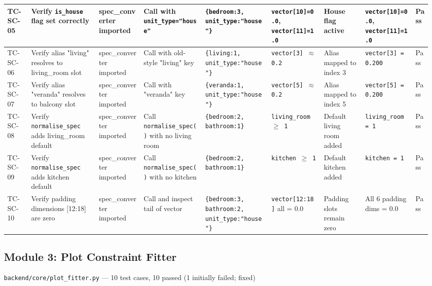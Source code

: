 \begin{landscape}
\begin{longtable}{|p{1.4cm}|p{3.2cm}|p{2.8cm}|p{2.8cm}|p{2.8cm}|p{2.8cm}|p{2.6cm}|p{2.8cm}|p{1.0cm}|}
\rowcolor{passgreen}
TC-SC-05 & Verify \texttt{is\_house} flag set correctly & spec\_converter imported & Call with \texttt{unit\_type="house"} & \texttt{\{bedroom:3, unit\_type:"house"\}} & \texttt{vector[10]=0.0}, \texttt{vector[11]=1.0} & House flag active & \texttt{vector[10]=0.0}, \texttt{vector[11]=1.0} & Pass \\ \hline

\rowcolor{passgreen}
TC-SC-06 & Verify alias "living" resolves to living\_room slot & spec\_converter imported & Call with old-style "living" key & \texttt{\{living:1, unit\_type:"house"\}} & \texttt{vector[3] $\approx$ 0.2} & Alias mapped to index 3 & \texttt{vector[3] = 0.200} & Pass \\ \hline

\rowcolor{passgreen}
TC-SC-07 & Verify alias "veranda" resolves to balcony slot & spec\_converter imported & Call with "veranda" key & \texttt{\{veranda:1, unit\_type:"house"\}} & \texttt{vector[5] $\approx$ 0.2} & Alias mapped to index 5 & \texttt{vector[5] = 0.200} & Pass \\ \hline

\rowcolor{passgreen}
TC-SC-08 & Verify \texttt{normalise\_spec} adds living\_room default & spec\_converter imported & Call \texttt{normalise\_spec()} with no living room & \texttt{\{bedroom:2, bathroom:1\}} & \texttt{living\_room $\geq$ 1} & Default living room added & \texttt{living\_room = 1} & Pass \\ \hline

\rowcolor{passgreen}
TC-SC-09 & Verify \texttt{normalise\_spec} adds kitchen default & spec\_converter imported & Call \texttt{normalise\_spec()} with no kitchen & \texttt{\{bedroom:2, bathroom:1\}} & \texttt{kitchen $\geq$ 1} & Default kitchen added & \texttt{kitchen = 1} & Pass \\ \hline

\rowcolor{passgreen}
TC-SC-10 & Verify padding dimensions [12:18] are zero & spec\_converter imported & Call and inspect tail of vector & \texttt{\{bedroom:3, bathroom:2, unit\_type:"house"\}} & \texttt{vector[12:18]} all = 0.0 & Padding slots remain zero & All 6 padding dims = 0.0 & Pass \\ \hline

\end{longtable}
\end{landscape}

\subsection{Module 3: Plot Constraint Fitter}
\texttt{backend/core/plot\_fitter.py} — 10 test cases, 10 passed (1 initially failed; fixed)

